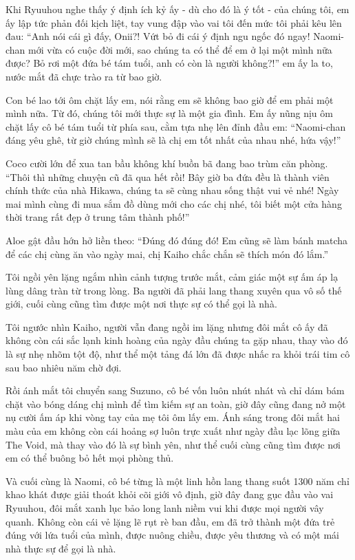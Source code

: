 ﻿\documentclass[../main.tex]{subfiles}
\begin{document}
Khi Ryuuhou nghe thấy ý định ích kỷ ấy - dù cho đó là ý tốt - của chúng tôi, em ấy lập tức phản đối kịch liệt, tay vung đập vào vai tôi đến mức tôi phải kêu lên đau: ``Anh nói cái gì đấy, Onii?! Vứt bỏ đi cái ý định ngu ngốc đó ngay! Naomi-chan mới vừa có cuộc đời mới, sao chúng ta có thể để em ở lại một mình nữa được? Bỏ rơi một đứa bé tám tuổi, anh có còn là người không?!'' em ấy la to, nước mắt đã chực trào ra từ bao giờ.

Con bé lao tới ôm chặt lấy em, nói rằng em sẽ không bao giờ để em phải một mình nữa. Từ đó, chúng tôi mới thực sự là một gia đình. Em ấy nũng nịu ôm chặt lấy cô bé tám tuổi từ phía sau, cằm tựa nhẹ lên đỉnh đầu em: ``Naomi-chan đáng yêu ghê, từ giờ chúng mình sẽ là chị em tốt nhất của nhau nhé, hứa vậy!''

Coco cười lớn để xua tan bầu không khí buồn bã đang bao trùm căn phòng. ``Thôi thì những chuyện cũ đã qua hết rồi! Bây giờ ba đứa đều là thành viên chính thức của nhà Hikawa, chúng ta sẽ cùng nhau sống thật vui vẻ nhé! Ngày mai mình cùng đi mua sắm đồ dùng mới cho các chị nhé, tôi biết một cửa hàng thời trang rất đẹp ở trung tâm thành phố!''

Aloe gật đầu hớn hở liền theo: ``Đúng đó đúng đó! Em cũng sẽ làm bánh matcha để các chị cùng ăn vào ngày mai, chị Kaiho chắc chắn sẽ thích món đó lắm.''

Tôi ngồi yên lặng ngắm nhìn cảnh tượng trước mắt, cảm giác một sự ấm áp lạ lùng dâng tràn từ trong lòng. Ba người đã phải lang thang xuyên qua vô số thế giới, cuối cùng cũng tìm được một nơi thực sự có thể gọi là nhà.

Tôi ngước nhìn Kaiho, người vẫn đang ngồi im lặng nhưng đôi mắt cô ấy đã không còn cái sắc lạnh kinh hoàng của ngày đầu chúng ta gặp nhau, thay vào đó là sự nhẹ nhõm tột độ, như thể một tảng đá lớn đã được nhấc ra khỏi trái tim cô sau bao nhiêu năm chờ đợi.

Rồi ánh mắt tôi chuyển sang Suzuno, cô bé vốn luôn nhút nhát và chỉ dám bám chặt vào bóng dáng chị mình để tìm kiếm sự an toàn, giờ đây cũng đang nở một nụ cười ấm áp khi vòng tay của mẹ tôi ôm lấy em. Ánh sáng trong đôi mắt hai màu của em không còn cái hoảng sợ luôn trực xuất như ngày đầu lạc lõng giữa The Void, mà thay vào đó là sự bình yên, như thể cuối cùng cũng tìm được nơi em có thể buông bỏ hết mọi phòng thủ.

Và cuối cùng là Naomi, cô bé từng là một linh hồn lang thang suốt 1300 năm chỉ khao khát được giải thoát khỏi cõi giới vô định, giờ đây đang gục đầu vào vai Ryuuhou, đôi mắt xanh lục bảo long lanh niềm vui khi được mọi người vây quanh. Không còn cái vẻ lặng lẽ rụt rè ban đầu, em đã trở thành một đứa trẻ đúng với lứa tuổi của mình, được nuông chiều, được yêu thương và có một mái nhà thực sự để gọi là nhà.
\end{document}
